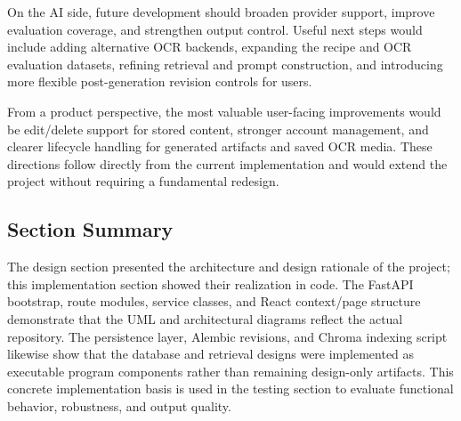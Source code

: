 On the AI side, future development should broaden provider support,
improve evaluation coverage, and strengthen output control. Useful next
steps would include adding alternative OCR backends, expanding the
recipe and OCR evaluation datasets, refining retrieval and prompt
construction, and introducing more flexible post-generation revision
controls for users.

From a product perspective, the most valuable user-facing improvements
would be edit/delete support for stored content, stronger account
management, and clearer lifecycle handling for generated artifacts and
saved OCR media. These directions follow directly from the current
implementation and would extend the project without requiring a
fundamental redesign.

\subsection{Section Summary}

The design section presented the architecture and design rationale of the
project; this implementation section showed their realization in code.
The FastAPI bootstrap, route modules, service classes, and React
context/page structure demonstrate that the UML and architectural
diagrams reflect the actual repository. The persistence layer, Alembic
revisions, and Chroma indexing script likewise show that the database
and retrieval designs were implemented as executable program components
rather than remaining design-only artifacts. This concrete
implementation basis is used in the testing section to evaluate
functional behavior, robustness, and output quality.
